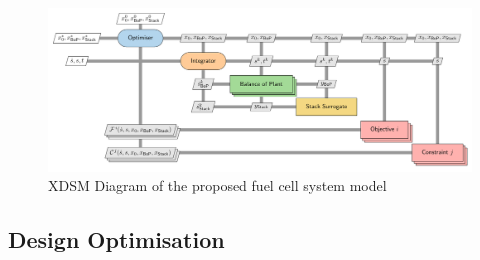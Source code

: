 \begin{center}
	\begin{figure}
		\includegraphics[width=\linewidth]{figures/xdsm.pdf}
		\caption{XDSM Diagram of the proposed fuel cell system model}
		\label{fig:xdsm}
	\end{figure}
\end{center}

\subsection{Design Optimisation}

